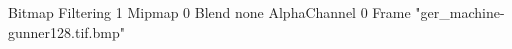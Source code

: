 {Bitmap
	{Filtering 1}
	{Mipmap 0}
	{Blend none}
	{AlphaChannel 0}
	{Frame "ger_machine-gunner128.tif.bmp"}
}
